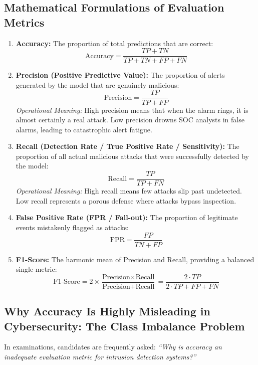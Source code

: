 \subsection{Mathematical Formulations of Evaluation Metrics}

\begin{enumerate}
\item \textbf{Accuracy:} The proportion of total predictions that are correct:
\[ \text{Accuracy} = \frac{TP + TN}{TP + TN + FP + FN} \]

\item \textbf{Precision (Positive Predictive Value):} The proportion of alerts generated by the model that are genuinely malicious:
\[ \text{Precision} = \frac{TP}{TP + FP} \]
\textit{Operational Meaning:} High precision means that when the alarm rings, it is almost certainly a real attack. Low precision drowns SOC analysts in false alarms, leading to catastrophic alert fatigue.

\item \textbf{Recall (Detection Rate / True Positive Rate / Sensitivity):} The proportion of all actual malicious attacks that were successfully detected by the model:
\[ \text{Recall} = \frac{TP}{TP + FN} \]
\textit{Operational Meaning:} High recall means few attacks slip past undetected. Low recall represents a porous defense where attacks bypass inspection.

\item \textbf{False Positive Rate (FPR / Fall-out):} The proportion of legitimate events mistakenly flagged as attacks:
\[ \text{FPR} = \frac{FP}{TN + FP} \]

\item \textbf{F1-Score:} The harmonic mean of Precision and Recall, providing a balanced single metric:
\[ \text{F1-Score} = 2 \times \frac{\text{Precision} \times \text{Recall}}{\text{Precision} + \text{Recall}} = \frac{2 \cdot TP}{2 \cdot TP + FP + FN} \]
\end{enumerate}

\subsection{Why Accuracy Is Highly Misleading in Cybersecurity: The Class Imbalance Problem}

In examinations, candidates are frequently asked: \textit{``Why is accuracy an inadequate evaluation metric for intrusion detection systems?''}

